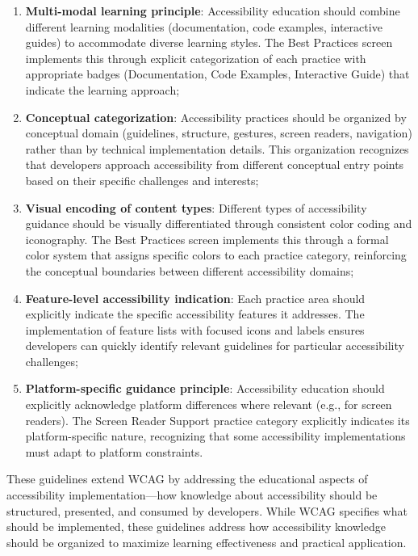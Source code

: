\begin{enumerate}
    \item \textbf{Multi-modal learning principle}: Accessibility education should combine different learning modalities (documentation, code examples, interactive guides) to accommodate diverse learning styles. The Best Practices screen implements this through explicit categorization of each practice with appropriate badges (Documentation, Code Examples, Interactive Guide) that indicate the learning approach;
    
    \item \textbf{Conceptual categorization}: Accessibility practices should be organized by conceptual domain (guidelines, structure, gestures, screen readers, navigation) rather than by technical implementation details. This organization recognizes that developers approach accessibility from different conceptual entry points based on their specific challenges and interests;
    
    \item \textbf{Visual encoding of content types}: Different types of accessibility guidance should be visually differentiated through consistent color coding and iconography. The Best Practices screen implements this through a formal color system that assigns specific colors to each practice category, reinforcing the conceptual boundaries between different accessibility domains;
    
    \item \textbf{Feature-level accessibility indication}: Each practice area should explicitly indicate the specific accessibility features it addresses. The implementation of feature lists with focused icons and labels ensures developers can quickly identify relevant guidelines for particular accessibility challenges;
    
    \item \textbf{Platform-specific guidance principle}: Accessibility education should explicitly acknowledge platform differences where relevant (e.g., for screen readers). The Screen Reader Support practice category explicitly indicates its platform-specific nature, recognizing that some accessibility implementations must adapt to platform constraints.
\end{enumerate}

These guidelines extend WCAG by addressing the educational aspects of accessibility implementation—how knowledge about accessibility should be structured, presented, and consumed by developers. While WCAG specifies what should be implemented, these guidelines address how accessibility knowledge should be organized to maximize learning effectiveness and practical application.

